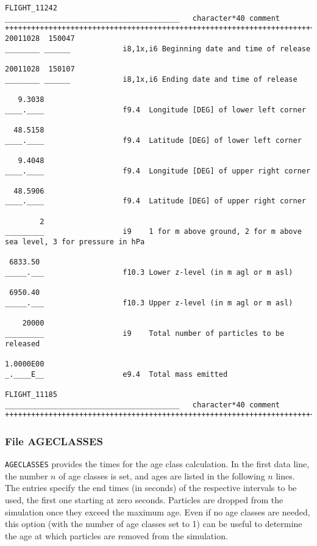 \documentclass{egu}                  %
\begin{document}
\begin{scriptsize}
\begin{verbatim}
FLIGHT_11242
________________________________________   character*40 comment
+++++++++++++++++++++++++++++++++++++++++++++++++++++++++++++++++++++++++
20011028  150047
________ ______            i8,1x,i6 Beginning date and time of release

20011028  150107
________ ______            i8,1x,i6 Ending date and time of release

   9.3038 
____.____                  f9.4  Longitude [DEG] of lower left corner

  48.5158
____.____                  f9.4  Latitude [DEG] of lower left corner

   9.4048
____.____                  f9.4  Longitude [DEG] of upper right corner

  48.5906
____.____                  f9.4  Latitude [DEG] of upper right corner

        2
_________                  i9    1 for m above ground, 2 for m above sea level, 3 for pressure in hPa

 6833.50
_____.___                  f10.3 Lower z-level (in m agl or m asl)
 
 6950.40
_____.___                  f10.3 Upper z-level (in m agl or m asl)
 
    20000                
_________                  i9    Total number of particles to be released

1.0000E00
_.____E__                  e9.4  Total mass emitted

FLIGHT_11185
________________________________________   character*40 comment
+++++++++++++++++++++++++++++++++++++++++++++++++++++++++++++++++++++++++

\end{verbatim}\end{scriptsize}

\newpage

\subsubsection{File AGECLASSES}

\verb|AGECLASSES| provides the times for the age class calculation.  In the
first data line, the number $n$ of age classes is set, and ages are listed in
the following $n$ lines.  The entries specify the end times (in seconds) of the
respective intervals to be used, the first one starting at zero seconds.
Particles are dropped from the simulation once they exceed the maximum age.
Even if no age classes are needed, this option (with the number of age classes
set to 1) can be useful to determine the age at which particles are removed
from the simulation.
\end{document}
